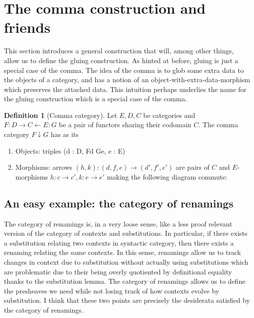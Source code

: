 \documentclass[12pt,twoside]{reedthesis}
\theoremstyle{definition}
\newtheorem{definition}{Definition}
\theoremstyle{remark}
\theoremstyle{plain}
\begin{document}
\section{The comma construction and friends}
This section introduces a general construction that will, among other things,
allow us to define the gluing construction. As hinted at before, gluing is just
a special case of the comma. The idea of the comma is to glob some extra data to
the objects of a category, and has a notion of an
object-with-extra-data-morphism which preserves the attached data. This
intuition perhaps underlies the name for the gluing construction which is a
special case of the comma.

\begin{definition}[Comma category]
  Let $E,D,C$ be categories and $F: D \rightarrow C \leftarrow E : G$ be a pair of functors sharing
  their codomain $C$. The comma category \( F \downarrow G \) has as its
  \begin{enumerate}
    \item Objects: triples (d : D, Fd  Ge, e : E)
    \item Morphisms: arrows $(h,k) : (d, f, e) \rightarrow (d', f', e')$ are pairs of
          $C$ and $E$-morphisms \(h : c \rightarrow c', k : e \rightarrow e'\) making the following
          diagram commute:
          \begin{tikzcd}
          \end{tikzcd}

  \end{enumerate}
\end{definition}

\subsection{An easy example: the category of renamings}
The category of renamings is, in a very loose sense, like a less proof relevant
version of the category of contexts and substitutions. In particular, if there
exists a substitution relating two contexts in syntactic category, then there
exists a renaming relating the same contexts. In this sense, renamings allow us
to track changes in context due to substitution without actually using
substitutions which are problematic due to their being overly quotiented by
definitional equality thanks to the substitution lemma. The category of
renamings allows us to define the presheaves we need while not losing track of
how contexts evolve by substitution. I think that these two points are precisely
the desiderata satisfied by the category of renamings.
\end{document}
